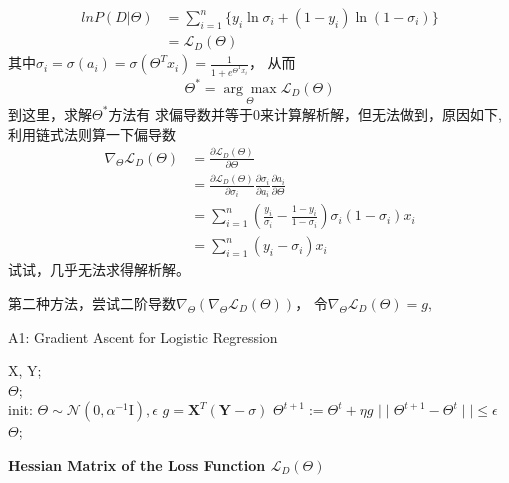 \documentclass[UTF8]{ctexart}
\begin{document}
\begin{equation*}
    \begin{aligned}
        lnP(D|\Theta) &= \sum_{i=1}^n \{y_i\ln\sigma_i +(1-y_i)\ln(1-\sigma_i)\}    \\
        &= \mathcal{L}_D(\Theta)
    \end{aligned}
\end{equation*}
其中$\sigma_i=\sigma(a_i)=\sigma(\Theta^Tx_i)=\frac{1}{1+e^{\Theta^Tx_i}}$， 从而
\begin{equation*}
    \Theta^* = \underset{\Theta}{\arg \max} {\mathcal{L}_D(\Theta)}
\end{equation*}
到这里，求解$\Theta^*$方法有 求偏导数并等于0来计算解析解，但无法做到，原因如下,利用链式法则算一下偏导数
\begin{equation*}
    \begin{aligned}
        \nabla_\Theta \mathcal{L}_D(\Theta) &=\frac{\partial \mathcal{L}_D ( \Theta) }{\partial \Theta} \\
        &= \frac{\partial\mathcal{L}_D ( \Theta)}{\partial \sigma_i}\frac{\partial \sigma_i}{\partial a_i}\frac{\partial a_i}{\partial \Theta}\\
        &= \sum_{i=1}^n(\frac{y_i}{\sigma_i}-\frac{1-y_i}{1-\sigma_i})\sigma_i(1-\sigma_i)x_i \\
        &= \sum_{i=1}^n(y_i-\sigma_i)x_i
    \end{aligned}
\end{equation*}
试试，几乎无法求得解析解。

第二种方法，尝试二阶导数$\nabla_\Theta(\nabla_\Theta \mathcal{L}_D(\Theta) )$， 令$\nabla_\Theta \mathcal{L}_D(\Theta) =g$,

\begin{algorithm}[htb]
    \caption{A1: Gradient Ascent for Logistic Regression}
    \label{alg:A1}
    \begin{algorithmic}[1]
    \REQUIRE
    X, Y; \\
    \ENSURE 
    $\Theta$; \\
    \STATE init: $\Theta \sim \mathcal{N}(0, \alpha^{-1}\mathrm{I}), \epsilon$
    \REPEAT 
    \STATE $g=\mathbf{X}^T(\mathbf{Y}-\sigma)$
    \STATE $\Theta^{t+1} := \Theta^t + \eta g$
    \UNTIL $\mid\mid \Theta^{t+1} -\Theta^t \mid\mid \leq \epsilon$
    \RETURN $\Theta$;
    \end{algorithmic}
\end{algorithm}

\textbf{Hessian Matrix of the Loss Function $\mathcal{L}_D(\Theta)$}
\end{document}
